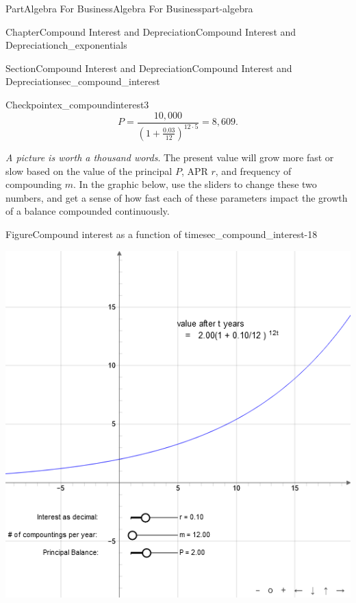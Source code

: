 \documentclass[oneside,10pt,]{tufte-book}
\numberwithin{equation}{chapter}
\begin{document}
\begin{partptx}{Part}{Algebra For Business}{}{Algebra For Business}{}{}{part-algebra}
\begin{chapterptx}{Chapter}{Compound Interest and Depreciation}{}{Compound Interest and Depreciation}{}{}{ch_exponentials}
\begin{sectionptx}{Section}{Compound Interest and Depreciation}{}{Compound Interest and Depreciation}{}{}{sec_compound_interest}
\begin{inlineexercise}{Checkpoint}{}{ex_compoundinterest3}
\begin{equation*}
P = \dfrac{10,000}{\left(1 + \frac{0.03}{12}\right)^{12\cdot 5}} = 8,609\text{.}
\end{equation*}
%
\par
%
\end{inlineexercise}%
\emph{A picture is worth a thousand words}. The present value will grow more fast or slow based on the value of the principal \(P\), APR \(r\), and frequency of compounding \(m\).  In the graphic below, use the sliders to change these two numbers, and get a sense of how fast each of these parameters impact the growth of a balance compounded continuously.%
\begin{figureptx}{Figure}{Compound interest as a function of time}{sec_compound_interest-18}{}%
\begin{sidebyside}{2}{0.075}{0.075}{0.17}%
\begin{sbspanel}{0.47}%
\includegraphics[width=\linewidth]{external/jsxgraph-algebra-compound-interest.png}
\end{sbspanel}%
\begin{sbspanel}{0.21}%

\end{sbspanel}
\end{sidebyside}
\end{figureptx}
\end{sectionptx}
\end{chapterptx}
\end{partptx}
\end{document}
